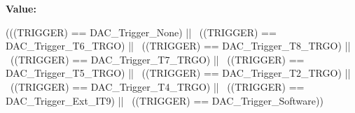 \label{group__DAC__trigger__selection_ga4409b79639e6ae3b1f0ed61a33c810a3}
{\bfseries Value:}
\begin{DoxyCode}
(((TRIGGER) == DAC_Trigger_None) || \
                                 ((TRIGGER) == DAC_Trigger_T6_TRGO) || \
                                 ((TRIGGER) == DAC_Trigger_T8_TRGO) || \
                                 ((TRIGGER) == DAC_Trigger_T7_TRGO) || \
                                 ((TRIGGER) == DAC_Trigger_T5_TRGO) || \
                                 ((TRIGGER) == DAC_Trigger_T2_TRGO) || \
                                 ((TRIGGER) == DAC_Trigger_T4_TRGO) || \
                                 ((TRIGGER) == DAC_Trigger_Ext_IT9) || \
                                 ((TRIGGER) == DAC_Trigger_Software))
\end{DoxyCode}

